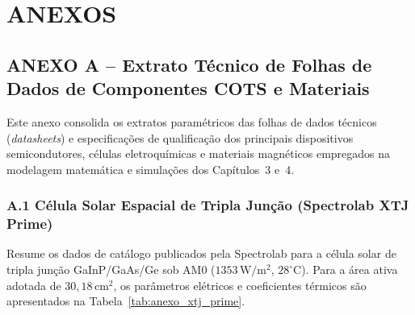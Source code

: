 
\newpage
\section*{ANEXOS}

\subsection*{ANEXO A -- Extrato Técnico de Folhas de Dados de Componentes COTS e Materiais}

Este anexo consolida os extratos paramétricos das folhas de dados técnicos (\textit{datasheets}) e especificações de qualificação dos principais dispositivos semicondutores, células eletroquímicas e materiais magnéticos empregados na modelagem matemática e simulações dos Capítulos~3 e~4.

\subsubsection*{A.1 Célula Solar Espacial de Tripla Junção (Spectrolab XTJ Prime)}
Resume os dados de catálogo publicados pela Spectrolab para a célula solar de tripla junção GaInP/GaAs/Ge sob AM0 ($1353\,\mathrm{W/m^2}$, $28^\circ\text{C}$). Para a área ativa adotada de $30{,}18\,\mathrm{cm^2}$, os parâmetros elétricos e coeficientes térmicos são apresentados na Tabela~\ref{tab:anexo_xtj_prime}.


